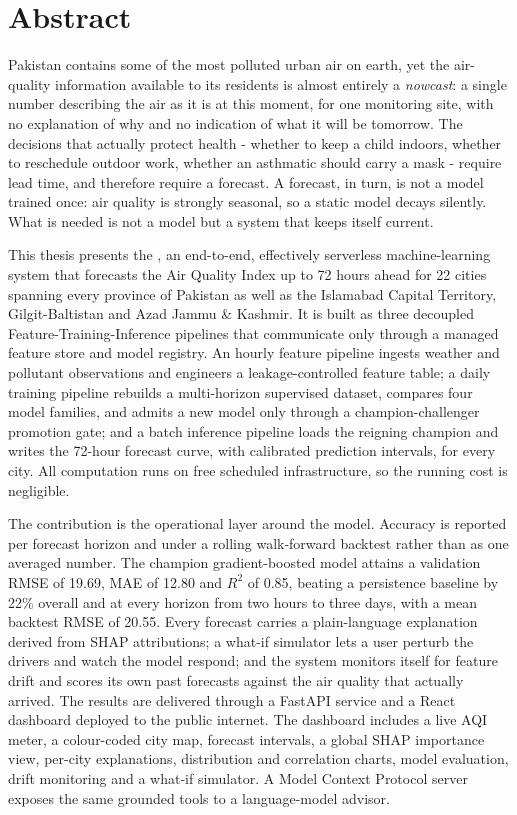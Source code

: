 \chapter*{Abstract}
\thispagestyle{plain}

Pakistan contains some of the most polluted urban air on earth, yet the
air-quality information available to its residents is almost entirely a
\emph{nowcast}: a single number describing the air as it is at this moment, for
one monitoring site, with no explanation of why and no indication of what it will
be tomorrow. The decisions that actually protect health - whether to keep a
child indoors, whether to reschedule outdoor work, whether an asthmatic should
carry a mask - require lead time, and therefore require a forecast. A forecast,
in turn, is not a model trained once: air quality is strongly seasonal, so a
static model decays silently. What is needed is not a model but a system that
keeps itself current.

This thesis presents the \projname, an end-to-end, effectively serverless
machine-learning system that forecasts the Air Quality Index up to 72 hours ahead
for 22 cities spanning every province of Pakistan as well as the Islamabad
Capital Territory, Gilgit-Baltistan and Azad Jammu \& Kashmir. It is built as
three decoupled Feature-Training-Inference pipelines that communicate only
through a managed feature store and model registry. An hourly feature pipeline
ingests weather and pollutant observations and engineers a leakage-controlled
feature table; a daily training pipeline rebuilds a multi-horizon supervised
dataset, compares four model families, and admits a new model only through a
champion-challenger promotion gate; and a batch inference pipeline loads the
reigning champion and writes the 72-hour forecast curve, with calibrated
prediction intervals, for every city. All computation runs on free scheduled
infrastructure, so the running cost is negligible.

The contribution is the operational layer around the model. Accuracy is reported
per forecast horizon and under a rolling walk-forward backtest rather than as one
averaged number. The champion gradient-boosted model attains a validation RMSE of
19.69, MAE of 12.80 and $R^2$ of 0.85, beating a persistence baseline by 22\%
overall and at every horizon from two hours to three days, with a mean backtest
RMSE of 20.55. Every forecast carries a plain-language explanation derived from
SHAP attributions; a what-if simulator lets a user perturb the drivers and watch
the model respond; and the system monitors itself for feature drift and scores
its own past forecasts against the air quality that actually arrived. The results
are delivered through a FastAPI service and a React dashboard deployed to the
public internet. The dashboard includes a live AQI meter, a colour-coded city map,
forecast intervals, a global SHAP importance view, per-city explanations,
distribution and correlation charts, model evaluation, drift monitoring and a
what-if simulator. A Model Context Protocol server exposes the same grounded tools
to a language-model advisor.

\clearpage
